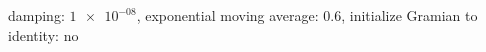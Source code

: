 damping: $\num[scientific-notation=true]{1e-08}$, exponential moving average: $\num[scientific-notation=true]{0.6}$, initialize Gramian to identity: $\text{no}$